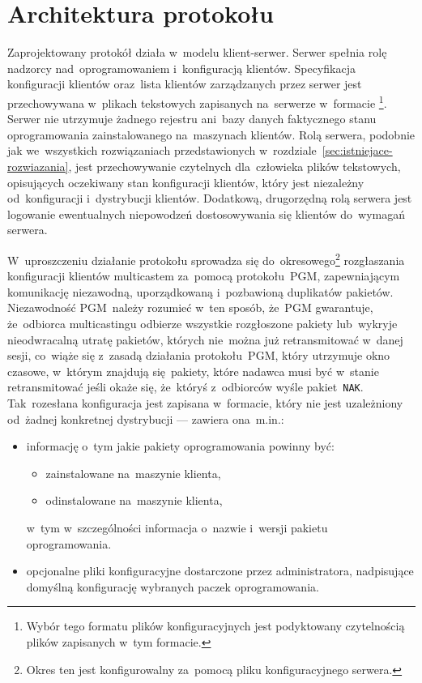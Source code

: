 \documentclass[thesis]{subfiles}
\begin{document}


\section{Architektura protokołu}

Zaprojektowany protokół działa w~modelu klient-serwer. Serwer spełnia rolę nadzorcy nad~oprogramowaniem i~konfiguracją klientów. Specyfikacja konfiguracji klientów oraz~lista klientów zarządzanych przez serwer jest przechowywana w~plikach tekstowych zapisanych na~serwerze w~formacie \footnote{Wybór tego formatu plików konfiguracyjnych jest podyktowany czytelnością plików zapisanych w~tym formacie.}. Serwer nie utrzymuje żadnego rejestru ani~bazy danych faktycznego stanu oprogramowania zainstalowanego na~maszynach klientów. Rolą serwera, podobnie jak we~wszystkich rozwiązaniach przedstawionych w~rozdziale~\ref{sec:istniejace-rozwiazania}, jest przechowywanie czytelnych dla~człowieka plików tekstowych, opisujących oczekiwany stan konfiguracji klientów, który jest niezależny od~konfiguracji i~dystrybucji  klientów. Dodatkową, drugorzędną rolą serwera jest logowanie ewentualnych niepowodzeń dostosowywania się klientów do~wymagań serwera.

W~uproszczeniu działanie protokołu sprowadza się do~okresowego\footnote{Okres ten jest konfigurowalny za~pomocą pliku konfiguracyjnego serwera.} rozgłaszania konfiguracji klientów multicastem za~pomocą protokołu~PGM, zapewniającym komunikację niezawodną, uporządkowaną i~pozbawioną duplikatów pakietów. Niezawodność PGM~należy rozumieć w~ten sposób, że~PGM gwarantuje, że~odbiorca multicastingu odbierze wszystkie rozgłoszone pakiety lub~wykryje nieodwracalną utratę pakietów, których nie~można już retransmitować w~danej sesji, co~wiąże się z~zasadą działania protokołu~PGM, który utrzymuje okno czasowe, w~którym znajdują się~pakiety, które nadawca musi być w~stanie retransmitować jeśli okaże się, że~któryś z~odbiorców wyśle pakiet~\texttt{NAK}. Tak~rozesłana konfiguracja jest zapisana w~formacie, który nie jest uzależniony od~żadnej konkretnej dystrybucji  --- zawiera ona~m.in.:
\begin{itemize}
	\item informację o~tym jakie pakiety oprogramowania powinny być:
	\begin{itemize}
		\item zainstalowane na~maszynie klienta,
		\item odinstalowane na~maszynie klienta,
	\end{itemize}
	w~tym w~szczególności informacja o~nazwie i~wersji pakietu oprogramowania.
	\item opcjonalne pliki konfiguracyjne dostarczone przez administratora, nadpisujące domyślną konfigurację wybranych paczek oprogramowania.
\end{itemize}
\end{document}

